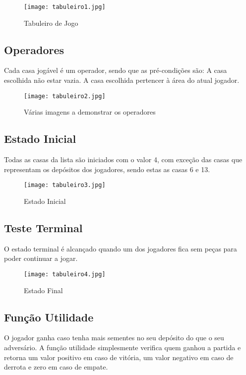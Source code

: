 \documentclass[conference]{IEEEtran}
\begin{document}
\begin{figure}[htbp]
    \centerline{\texttt{[image: tabuleiro1.jpg]}}
    \caption{Tabuleiro de Jogo}
    \label{img2}
\end{figure}

\subsection{Operadores}
Cada casa jogável é um operador, sendo que as pré-condições são:
A casa escolhida não estar vazia.
A casa escolhida pertencer à área do atual jogador.

\begin{figure}[htbp]
    \centerline{\texttt{[image: tabuleiro2.jpg]}}
    \caption{Várias imagens a demonstrar os operadores}
    \label{img3}
\end{figure}

\subsection{Estado Inicial}
Todas as casas da lista são iniciados com o valor 4, com exceção das casas que representam os depósitos dos jogadores, sendo estas as casas 6 e 13.

\begin{figure}[htbp]
    \centerline{\texttt{[image: tabuleiro3.jpg]}}
    \caption{Estado Inicial}
    \label{img4}
\end{figure}


\subsection{Teste Terminal}
O estado terminal é alcançado quando um dos jogadores fica sem peças para poder continuar a jogar.\\

\begin{figure}[htbp]
    \centerline{\texttt{[image: tabuleiro4.jpg]}}
    \caption{Estado Final}
    \label{img5}
\end{figure}

\subsection{Fun\c c\~ao Utilidade}
O jogador ganha caso tenha mais sementes no seu depósito do que o seu adversário. A função utilidade simplesmente verifica quem ganhou a partida e retorna um valor positivo em caso de vitória, um valor negativo em caso de derrota e zero em caso de empate.
\end{document}

